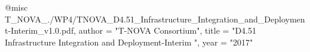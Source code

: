 @misc{ T_NOVA_./WP4/TNOVA_D4.51_Infrastructure_Integration_and_Deployment-Interim_v1.0.pdf,
       author = "T-NOVA Consortium",
       title = "D4.51 Infrastructure Integration and Deployment-Interim ",
       year = "2017" }
